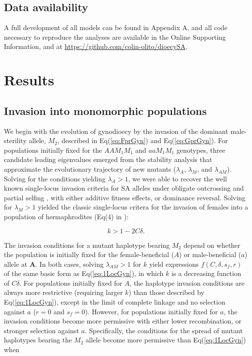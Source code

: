 \documentclass[9pt,twocolumn,twoside,lineno]{gsajnl}
\begin{document}
\subsection{Data availability}
A full development of all models can be found in Appendix A, and all code necessary to reproduce the analyses are available in the Online Supporting Information, and at \url{https://github.com/colin-olito/dioecySA}.


\section{Results}

\subsection{Invasion into monomorphic populations}

We begin with the evolution of gynodioecy by the invasion of the dominant male-sterility allele, $M_2$, described in Eq(\ref{eq:FprGyn}) and Eq(\ref{eq:GprGyn}). For populations initially fixed for the $AAM_1M_1$ and $aaM_1M_1$ genotypes, three candidate leading eigenvalues emerged from the stability analysis that approximate the evolutionary trajectory of new mutants ($\lambda_A$, $\lambda_M$, and $\lambda_{AM}$). Solving for the conditions yielding $\lambda_A > 1$, we were able to recover the well known single-locus invasion criteria for SA alleles under obligate outcrossing \citep{Kidwell1977} and partial selfing \citep{JordanConnallon2014,Olito2017}, with either additive fitness effects, or dominance reversal. Solving for $\lambda_M > 1$ yielded the classic single-locus critera for the invasion of females into a population of hermaphrodites (Eq(4) in \citealt{Charlesworth1978a}):

\begin{equation}\label{eq:1LocGyn}
	k > 1 - 2 C \delta.
\end{equation}

\noindent The invasion conditions for a mutant haplotype bearing $M_2$ depend on whether the population is initially fixed for the female-beneficial ($A$) or male-beneficial ($a$) allele at $\mathbf{A}$. In both cases, solving $\lambda_{AM} > 1$ for $k$ yield expressions $f(C,\delta,s_f,r)$ of the same basic form as Eq(\ref{eq:1LocGyn}), in which $k$ is a decreasing function of $C \delta$. For populations initially fixed for $A$, the haplotype invasion conditions are always more restrictive (requiring larger $k$) than those described by Eq(\ref{eq:1LocGyn}), except in the limit of complete linkage and no selection against $a$ ($r=0$ and $s_f = 0$). However, for populations initially fixed for $a$, the invasion conditions become more permissive with either lower recombination, or stronger selection against $a$. Specifically, the conditions for the spread of mutant haplotypes bearing the $M_2$ allele become more permissive than Eq(\ref{eq:1LocGyn}) when 
\end{document}
